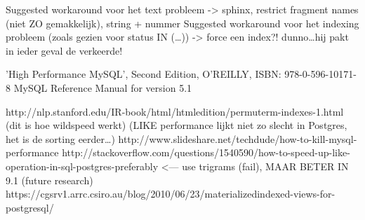 Suggested workaround voor het text probleem -> sphinx, restrict fragment names (niet ZO gemakkelijk), string + nummer
Suggested workaround voor het indexing probleem (zoals gezien voor status IN (\ldots)) -> force een index?! dunno\ldots hij pakt in ieder geval de verkeerde!

'High Performance MySQL', Second Edition, O'REILLY, ISBN: 978-0-596-10171-8
MySQL Reference Manual for version 5.1

http://nlp.stanford.edu/IR-book/html/htmledition/permuterm-indexes-1.html (dit is hoe wildspeed werkt) (LIKE performance lijkt niet zo slecht in Postgres, het is de sorting eerder\ldots)
http://www.slideshare.net/techdude/how-to-kill-mysql-performance
http://stackoverflow.com/questions/1540590/how-to-speed-up-like-operation-in-sql-postgres-preferably <--- use trigrams (fail), MAAR BETER IN 9.1 (future research)
https://cgsrv1.arrc.csiro.au/blog/2010/06/23/materializedindexed-views-for-postgresql/